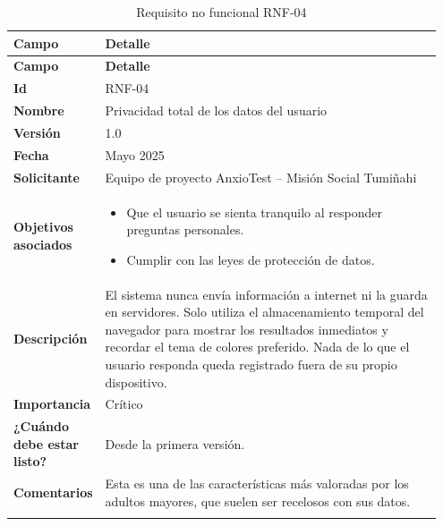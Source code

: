 \begin{longtable}{p{0.15\linewidth} p{0.80\linewidth}}
\toprule
\rowcolor{tableheader!20}
\textbf{Campo} & \textbf{Detalle} \\
\midrule
\endfirsthead
\rowcolor{tableheader!20}
\textbf{Campo} & \textbf{Detalle} \\
\midrule
\endhead
\bottomrule
\endfoot
\textbf{Id} & RNF-04 \\
\textbf{Nombre} & Privacidad total de los datos del usuario \\
\textbf{Versión} & 1.0 \\
\textbf{Fecha} & Mayo 2025 \\
\textbf{Solicitante} & Equipo de proyecto AnxioTest – Misión Social Tumiñahi \\
\textbf{Objetivos asociados} & 
  \begin{itemize}
    \item Que el usuario se sienta tranquilo al responder preguntas personales.
    \item Cumplir con las leyes de protección de datos.
  \end{itemize} \\
\textbf{Descripción} & El sistema nunca envía información a internet ni la guarda en servidores. Solo utiliza el almacenamiento temporal del navegador para mostrar los resultados inmediatos y recordar el tema de colores preferido. Nada de lo que el usuario responda queda registrado fuera de su propio dispositivo. \\
\textbf{Importancia} & Crítico \\
\textbf{¿Cuándo debe estar listo?} & Desde la primera versión. \\
\textbf{Comentarios} & Esta es una de las características más valoradas por los adultos mayores, que suelen ser recelosos con sus datos. \\
\bottomrule
\caption{Requisito no funcional RNF-04}
\end{longtable}

